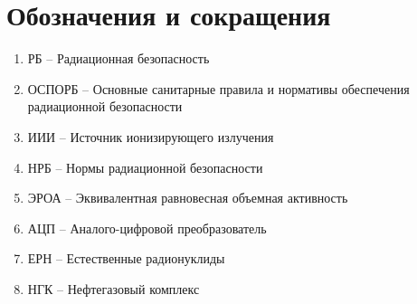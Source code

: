 \chapter{Обозначения и сокращения}
    \begin{enumerate}
        \item РБ -- Радиационная безопасность
        \item ОСПОРБ -- Основные санитарные правила и нормативы 
            обеспечения радиационной безопасности
    	\item ИИИ -- Источник ионизирующего излучения
        \item НРБ -- Нормы радиационной безопасности 
        \item ЭРОА -- Эквивалентная равновесная объемная активность
        \item АЦП -- Аналого-цифровой преобразователь
        \item ЕРН -- Естественные радионуклиды
        \item НГК -- Нефтегазовый комплекс
    \end{enumerate}